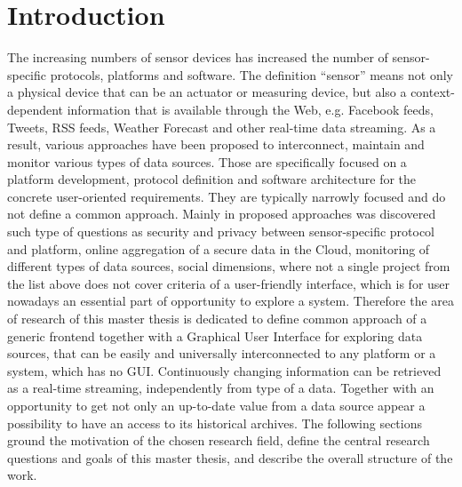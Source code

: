
\chapter{Introduction}

  \begin{singlespace}
     The increasing numbers of sensor devices has increased the number of sensor-specific protocols, platforms and software. The definition ``sensor'' means not only a physical device that can be an actuator or measuring device, but also a context-dependent information that is available through the Web, e.g. Facebook feeds, Tweets, RSS feeds, Weather Forecast and other real-time data streaming. As a result, various approaches have been proposed to interconnect, maintain and monitor various types of data sources\cite{6588063,bendel2013service,song2010real}. Those are specifically focused on a platform development, protocol definition and software architecture for the concrete user-oriented requirements. They are typically narrowly focused and do not define a common approach. Mainly in proposed approaches was discovered such type of questions as security and privacy between sensor-specific protocol and platform, online aggregation of a secure data in the Cloud, monitoring of different types of data sources, social dimensions\cite{eggert2013sensorcloud}, where not a single project from the list above does not cover criteria of a user-friendly interface, which is for user nowadays an essential part of opportunity to explore a system. Therefore the area of research of this master thesis is dedicated to define common approach of a generic frontend together with a Graphical User Interface for exploring data sources, that can be easily and universally interconnected to any platform or a system, which has no GUI. Continuously changing information can be retrieved as a real-time streaming, independently from type of a data. Together with an opportunity to get not only an up-to-date value from a data source appear a possibility to have an access to its historical archives. The following sections ground the motivation of the chosen research field, define the central research questions and goals of this master thesis, and describe the overall structure of the work.
  \end{singlespace}

